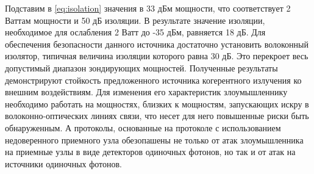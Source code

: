 Подставим в \ref{eq:isolation} значения в 33 дБм мощности, что соответствует 2 Ваттам мощности и 50 дБ изоляции. В результате значение изоляции, необходимое для ослабления 2 Ватт до -35 дБм, равняется 18 дБ. Для обеспечения безопасности данного источника достаточно установить волоконный изолятор, типичная величина изоляции которого равна 30 дБ. Это перекроет весь допустимый диапазон зондирующих мощностей. 
\newline Полученные результаты демонстрируют стойкость предложенного источника когерентного излучения ко внешним воздействиям. Для изменения его характеристик злоумышленнику необходимо работать на мощностях, близких к мощностям, запускающих искру в волоконно-оптических линиях связи, что несет для него повышенные риски быть обнаруженным. А протоколы, основанные на протоколе с использованием недоверенного приемного узла обезопашены не только от атак злоумышленника на приемные узлы в виде детекторов одиночных фотонов, но так и от атак на источники одиночных фотонов.
%
%